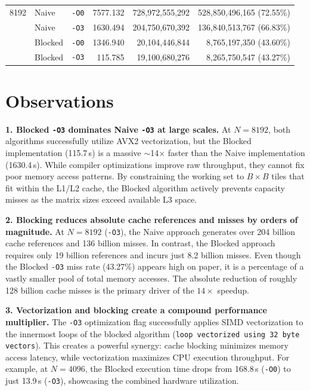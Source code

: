 \documentclass[10pt,a4paper]{article}
\begin{document}
\begin{table}[h!]
\begin{tabular}{c l l r r r}
\midrule

8192 & Naive   & \texttt{-O0} & 7577.132  & 728,972,555,292 & 528,850,496,165 (72.55\%) \\
     & Naive   & \texttt{-O3} & 1630.494  & 204,750,670,392 & 136,840,513,767 (66.83\%) \\
\rowcolor{rowgray}
     & Blocked & \texttt{-O0} & 1346.940  &  20,104,446,844 &   8,765,197,350 (43.60\%) \\
\rowcolor{rowgray}
     & Blocked & \texttt{-O3} & 115.785   &  19,100,680,276 &   8,265,750,547 (43.27\%) \\

\bottomrule
\end{tabular}

\end{table}

\vspace{1pt}

\section{Observations}

\textbf{1. Blocked \texttt{-O3} dominates Naive \texttt{-O3} at large scales.}
At $N=8192$, both algorithms successfully utilize AVX2 vectorization, but the Blocked implementation (115.7\,s) is a massive $\sim$14$\times$ faster than the Naive implementation (1630.4\,s). While compiler optimizations improve raw throughput, they cannot fix poor memory access patterns. By constraining the working set to $B \times B$ tiles that fit within the L1/L2 cache, the Blocked algorithm actively prevents capacity misses as the matrix sizes exceed available L3 space.

\textbf{2. Blocking reduces absolute cache references and misses by orders of magnitude.}
At $N=8192$ (\texttt{-O3}), the Naive approach generates over 204 billion cache references and 136 billion misses. In contrast, the Blocked approach requires only 19 billion references and incurs just 8.2 billion misses. Even though the Blocked \texttt{-O3} miss rate (43.27\%) appears high on paper, it is a percentage of a vastly smaller pool of total memory accesses. The absolute reduction of roughly 128 billion cache misses is the primary driver of the $14\times$ speedup.

\textbf{3. Vectorization and blocking create a compound performance multiplier.}
The \texttt{-O3} optimization flag successfully applies SIMD vectorization to the innermost loops of the blocked algorithm (\texttt{loop vectorized using 32 byte vectors}). This creates a powerful synergy: cache blocking minimizes memory access latency, while vectorization maximizes CPU execution throughput. For example, at $N=4096$, the Blocked execution time drops from 168.8\,s (\texttt{-O0}) to just 13.9\,s (\texttt{-O3}), showcasing the combined hardware utilization.
\end{document}
